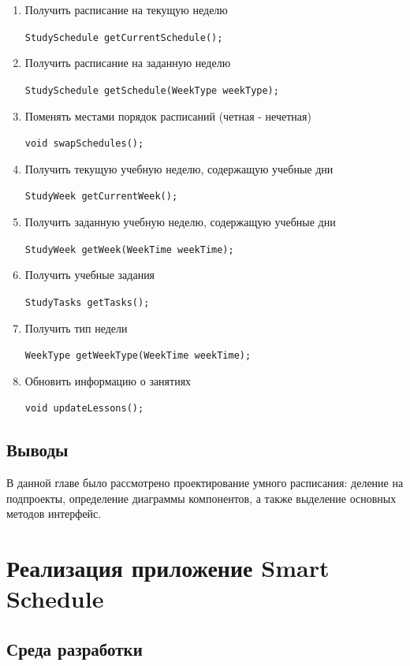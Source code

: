 \begin{enumerate}

    \item Получить расписание на текущую неделю

    \verb+StudySchedule getCurrentSchedule();+


    \item Получить расписание на заданную неделю

    \verb+StudySchedule getSchedule(WeekType weekType);+


    \item Поменять местами порядок расписаний (четная - нечетная)

    \verb+void swapSchedules();+


    \item Получить текущую учебную неделю, содержащую учебные дни

    \verb+StudyWeek getCurrentWeek();+


    \item Получить заданную учебную неделю, содержащую учебные дни

    \verb+StudyWeek getWeek(WeekTime weekTime);+


    \item Получить учебные задания

    \verb+StudyTasks getTasks();+


    \item Получить тип недели

    \verb+WeekType getWeekType(WeekTime weekTime);+

    
    \item Обновить информацию о занятиях

    \verb+void updateLessons();+
    
\end{enumerate}

\subsection{Выводы}
В данной главе было рассмотрено проектирование умного расписания: деление на подпроекты, определение диаграммы компонентов, а также выделение основных методов интерфейс.

\section{Реализация приложение Smart Schedule}

\subsection{Среда разработки}

